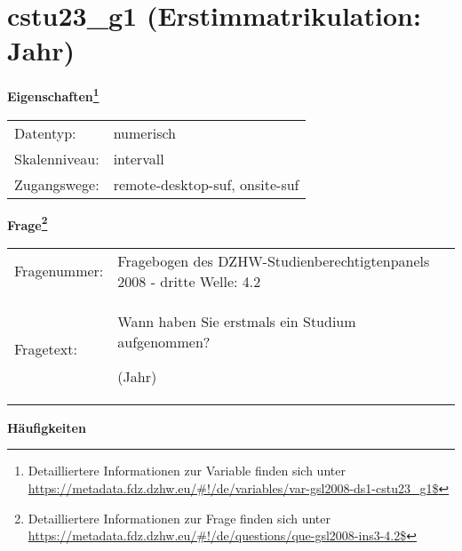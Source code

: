 
    \setcounter{footnote}{0}

    \vspace*{-1.8cm}
	\section{cstu23\_g1 (Erstimmatrikulation: Jahr)}
	\label{section:cstu23_g1}



    \vspace*{0.5cm}
    \noindent\textbf{Eigenschaften\footnote{Detailliertere Informationen zur Variable finden sich unter
		\url{https://metadata.fdz.dzhw.eu/\#!/de/variables/var-gsl2008-ds1-cstu23_g1$}}}\\
	\begin{tabularx}{\hsize}{@{}lX}
	Datentyp: & numerisch \\
	Skalenniveau: & intervall \\
	Zugangswege: &
	  remote-desktop-suf, 
	  onsite-suf
 \\
    \end{tabularx}



				\vspace*{0.5cm}
                \noindent\textbf{Frage\footnote{Detailliertere Informationen zur Frage finden sich unter
		              \url{https://metadata.fdz.dzhw.eu/\#!/de/questions/que-gsl2008-ins3-4.2$}}}\\
				\begin{tabularx}{\hsize}{@{}lX}
					Fragenummer: &
					  Fragebogen des DZHW-Studienberechtigtenpanels 2008 - dritte Welle:
					  4.2
 \\
					Fragetext: & Wann haben Sie erstmals ein Studium aufgenommen?\par  (Jahr) \\
				\end{tabularx}





        		\vspace*{0.5cm}
                \noindent\textbf{Häufigkeiten}

